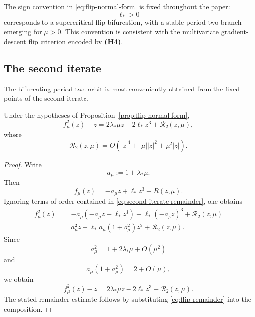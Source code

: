\begin{remark}
\label{rem:flip-sign-convention}
The sign convention in \eqref{eq:flip-normal-form} is fixed
throughout the paper:
\[
\ell_*>0
\]
corresponds to a supercritical flip bifurcation, with a stable
period-two branch emerging for $\mu>0$.
This convention is consistent with the multivariate
gradient-descent flip criterion encoded by \textbf{(H4)}.
\end{remark}

\subsection{The second iterate}
\label{subsec:second-iterate}

The bifurcating period-two orbit is most conveniently obtained from
the fixed points of the second iterate.

\begin{lemma}
\label{lem:second-iterate-expansion}
Under the hypotheses of
Proposition~\ref{prop:flip-normal-form},
\begin{equation}
f_\mu^2(z)-z
=
2\lambda_*\mu z
-
2\ell_*z^3
+
\mathcal R_2(z,\mu),
\label{eq:second-iterate-expansion}
\end{equation}
where
\begin{equation}
\mathcal R_2(z,\mu)
=
O\left(
|z|^4
+
|\mu||z|^2
+
\mu^2|z|
\right).
\label{eq:second-iterate-remainder}
\end{equation}
\end{lemma}

\begin{proof}
Write
\[
a_\mu:=1+\lambda_*\mu.
\]
Then
\[
f_\mu(z)
=
-a_\mu z+\ell_*z^3+R(z,\mu).
\]
Ignoring terms of order contained in
\eqref{eq:second-iterate-remainder}, one obtains
\begin{align}
f_\mu^2(z)
&=
-a_\mu
\left(
-a_\mu z+\ell_*z^3
\right)
+
\ell_*
\left(
-a_\mu z
\right)^3
+
\mathcal R_2(z,\mu)
\nonumber\\
&=
a_\mu^2z
-
\ell_*a_\mu(1+a_\mu^2)z^3
+
\mathcal R_2(z,\mu).
\label{eq:second-compose}
\end{align}
Since
\[
a_\mu^2
=
1+2\lambda_*\mu+O(\mu^2)
\]
and
\[
a_\mu(1+a_\mu^2)
=
2+O(\mu),
\]
we obtain
\[
f_\mu^2(z)-z
=
2\lambda_*\mu z
-
2\ell_*z^3
+
\mathcal R_2(z,\mu).
\]
The stated remainder estimate follows by substituting
\eqref{eq:flip-remainder} into the composition.
\end{proof}

